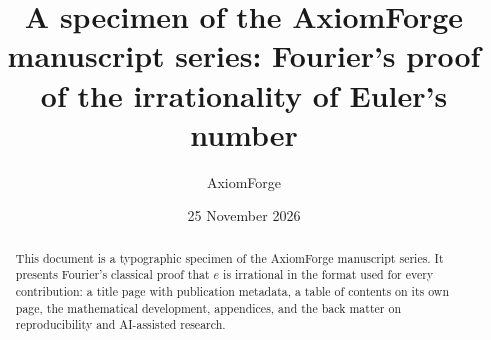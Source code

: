 \documentclass[11pt]{amsart}
\title[A specimen of the series]{A specimen of the AxiomForge manuscript series: Fourier's proof of the irrationality of Euler's number}
\author{AxiomForge}
\date{25 November 2026}
\begin{document}
\begin{abstract}
This document is a typographic specimen of the AxiomForge manuscript series. It presents Fourier's classical proof that $e$ is irrational in the format used for every contribution: a title page with publication metadata, a table of contents on its own page, the mathematical development, appendices, and the back matter on reproducibility and AI-assisted research.
\end{abstract}

\affrontmatter




\appendix


\clearpage



\clearpage


\end{document}
